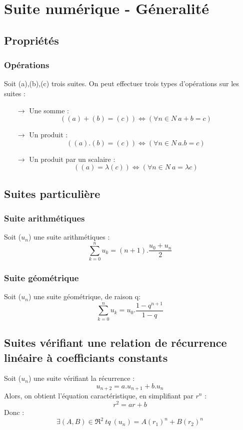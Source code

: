 \chapter{Suite num\'erique - G\'eneralit\'e}
\section{Propriétés}
\subsection{Opérations}
Soit (a),(b),(c) trois suites. On peut effectuer trois types d'opérations sur les suites :
\begin{itemize}
 \item[$\rightarrow$] Une somme : 
$$((a)+(b) = (c)) \Leftrightarrow (\forall n \in N~ a+b =c)$$
 \item[$\rightarrow$] Un produit : 
$$((a).(b) = (c)) \Leftrightarrow (\forall n \in N~ a.b =c)$$
 \item[$\rightarrow$] Un produit par un scalaire : 
$$((a) = \lambda(c)) \Leftrightarrow (\forall n \in N~ a = \lambda c)$$
\end{itemize}
\section{Suites particulière}
\subsection{Suite arithmétiques}
Soit ($u_n$) une suite arithmétiques :
$$\sum_{k=0}^n u_k = (n+1).\dfrac{u_0+u_n}{2}$$
\subsection{Suite géométrique}
Soit ($u_n$) une suite géométrique, de raison q:
$$\sum_{k=0}^n u_k = u_0.\dfrac{1-q^{n+1}}{1-q}$$
\section{Suites vérifiant une relation de récurrence linéaire à coefficiants constants}
Soit ($u_n$) une suite vérifiant la récurrence :
$$u_{n+2} = a.u_{n+1} + b.u_{n}$$
Alors, on obtient l'équation caractéristique, en simplifiant par $r^n$ :
$$r^2 = ar+b$$
Donc :
$$\exists(A,B)\in \Re^2~ tq~ (u_n) = A(r_1)^n+B(r_2)^n$$
